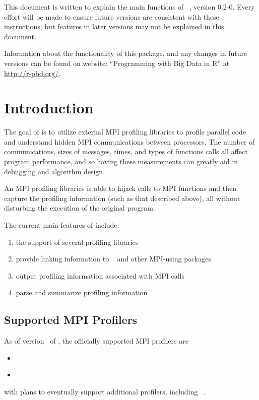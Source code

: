 This document is written to explain the main
functions of ~\citep{Chen2013pbdPROFpackage}, version 0.2-0.
Every effort will be made to ensure future versions are consistent with
these instructions, but features in later versions may not be explained
in this document.

Information about the functionality of this package,
and any changes in future versions can be found on website:
``Programming with Big Data in R'' at
\url{http://r-pbd.org/}.



\section{Introduction}
\label{sec:introduction}

The goal of  is to utilize external MPI profiling libraries
to profile parallel  code and understand hidden MPI
communications between processors. The number of communications,
sizes of messages, times, and types of functions calls all affect program
performance, and so having these measurements can greatly aid in debugging and 
algorithm design. 

An MPI profiling libraries is able to
hijack calls to MPI functions and then capture the profiling information 
(such as that described above), all without disturbing the execution of the original program.

The current main features of  include:
\begin{enumerate}
  \item the support of several profiling libraries
  \item provide linking information to ~\citep{pbdR2012} and other MPI-using  packages
  \item output profiling information associated with MPI calls
  \item parse and summarize profiling information
\end{enumerate}



\subsection{Supported MPI Profilers}

As of version \profversion\ of , the officially supported MPI profilers are
\begin{itemize}
  \item {}~\citep{fpmpi}
  \item {}~\citep{mpiP}
\end{itemize}
with plans to eventually support additional profilers, including ~\citep{TAU}.




